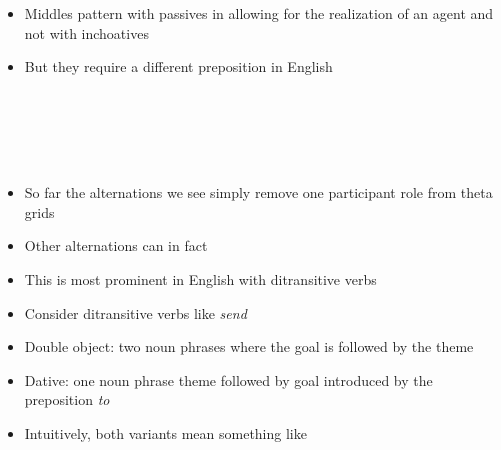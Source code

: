 \documentclass[headrule,footrule]{foils}
\begin{document}

\begin{itemize}
\item Middles pattern with passives in allowing for the realization of an agent and not with inchoatives
\item But they require a different preposition in English
\end{itemize}
\begin{exe}
  \ex \begin{xlist}
    \ex {}
    \\
    \ex {} \\
    \ex {} \\
    \ex {} \\
  \end{xlist}
\end{exe}

\begin{itemize}
\item So far the alternations we see simply remove one participant role from theta grids
\item Other alternations can in fact 
\item This is most prominent in English with ditransitive verbs
\end{itemize}

\begin{itemize}
\item Consider ditransitive verbs like \emph{send} 
\item Double object: two noun phrases where the goal is followed by the theme
\item Dative: one noun phrase theme followed by goal introduced by the preposition \emph{to}
\item Intuitively, both variants mean something like 
\end{itemize}

\begin{exe}
  \ex \begin{xlist}
    \ex {}
    \\
    \ex {} \\
  \end{xlist}
\end{exe}
\end{document}
